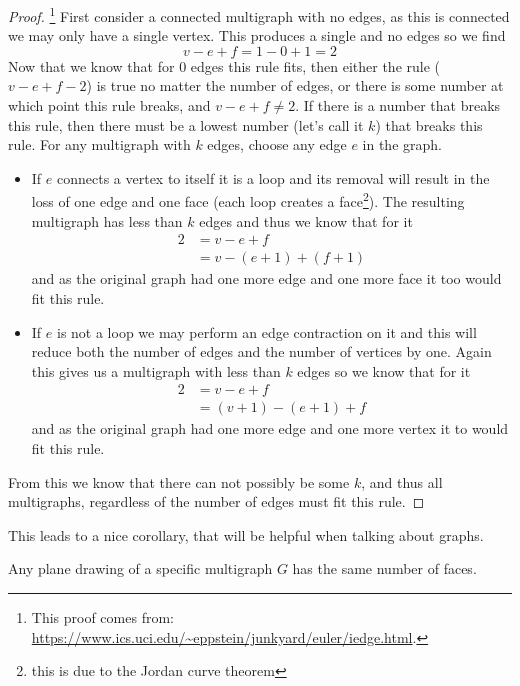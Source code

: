 \documentclass{article}
\begin{document}
\begin{proof}\footnote{This proof comes from: \url{https://www.ics.uci.edu/~eppstein/junkyard/euler/iedge.html}.}
	First consider a connected multigraph with no edges, as this is connected we may only have a single vertex. This produces a single and no edges so we find $$v-e+f=1-0+1=2$$ Now that we know that for 0 edges this rule fits, then either the rule ($v-e+f-2$) is true no matter the number of edges, or there is some number at which point this rule breaks, and $v-e+f\not=2$. If there is a number that breaks this rule, then there must be a lowest number (let's call it $k$) that breaks this rule. For any multigraph with $k$ edges, choose any edge $e$ in the graph.
	\begin{itemize}
		\item If $e$ connects a vertex to itself it is a loop and its removal will result in the loss of one edge and one face (each loop creates a face\footnote{this is due to the Jordan curve theorem}). The resulting multigraph has less than $k$ edges and thus we know that for it \begin{align*}2&=v-e+f \\&= v-(e+1)+(f+1)\end{align*} and as the original graph had one more edge and one more face it too would fit this rule.
		\item If $e$ is not a loop we may perform an edge contraction on it and this will reduce both the number of edges and the number of vertices by one. Again this gives us a multigraph with less than $k$ edges so we know that for it \begin{align*}2&=v-e+f\\&=(v+1)-(e+1)+f\end{align*} and as the original graph had one more edge and one more vertex it to would fit this rule.
	\end{itemize}
	
	From this we know that there can not possibly be some $k$, and thus all multigraphs, regardless of the number of edges must fit this rule.
\end{proof}
This leads to a nice corollary, that will be helpful when talking about graphs.
\begin{corallary}
	Any plane drawing of a specific multigraph $G$ has the same number of faces.
\end{corallary}
\end{document}
